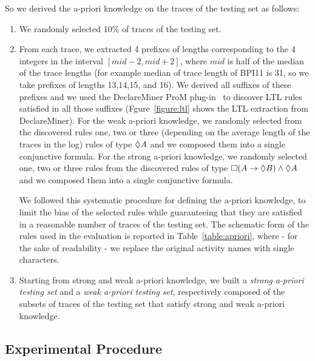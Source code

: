 So we derived the a-priori knowledge on the traces of the testing set as follows:
\begin{enumerate}
\item We randomly selected 10\% of traces of the testing set. 
\item From each trace, we extracted 4 prefixes of lengths corresponding to the 4 integers in the interval $\left[mid-2,mid+2\right]$, where $mid$ is half of the median of the trace lengths (for example median of trace length of BPI11 is 31, so we take prefixes of lengths 13,14,15, and 16). We derived all suffixes of these prefixes and we used the DeclareMiner ProM plug-in~\cite{Maggi2012} to discover LTL rules satisfied in all those suffixes (Fgure~\ref{figure:ltl} shows the LTL extraction from DeclareMiner). 
\subitem For the weak a-priori knowledge, we randomly selected from the discovered rules one, two or three (depending on the average length of the traces in the log) rules of type $\lozenge A$ and we composed them into a single conjunctive formula. 
\subitem For the strong a-priori knowledge, we randomly selected one, two or three rules from the discovered rules of type $\square(A \rightarrow \lozenge B) \wedge \lozenge A$ and we composed them into a single conjunctive formula. 

We followed this systematic procedure for defining the a-priori knowledge, to limit the bias of the selected rules while guaranteeing that they are satisfied in a reasonable number of traces of the testing set. The schematic form of the rules used in the evaluation is reported in Table~\ref{table:apriori}, where - for the sake of readability - we replace the original activity names with single characters. 
\item Starting from strong and weak a-priori knowledge, we built a \emph{strong a-priori testing set} and a \emph{weak a-priori testing set}, respectively composed of the subsets of traces of the testing set that satisfy strong and weak a-priori knowledge.

\end{enumerate}

\subsection{Experimental Procedure}
\label{ssec:procedure}



